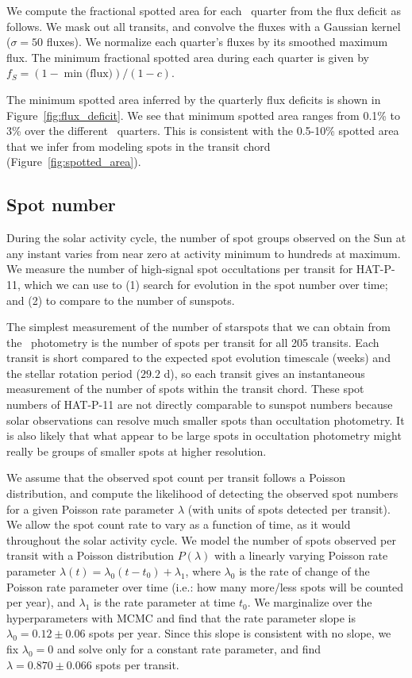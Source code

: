 We compute the fractional spotted area for each \kepler\ quarter from the flux deficit as follows. We mask out all transits, and convolve the fluxes with a Gaussian kernel ($\sigma=50$ fluxes). We normalize each quarter's fluxes by its smoothed maximum flux. The minimum fractional spotted area during each quarter is given by $f_S = \left( 1 - \min\textrm{(flux)} \right)/(1-c)$.

The minimum spotted area inferred by the quarterly flux deficits is shown in Figure~\ref{fig:flux_deficit}. We see that minimum spotted area ranges from 0.1\% to 3\% over the different \kepler\ quarters. This is consistent with the 0.5-10\% spotted area that we infer from modeling spots in the transit chord (Figure~\ref{fig:spotted_area}).  


\subsection{Spot number} \label{sec:spot_number}

During the solar activity cycle, the number of spot groups observed on the Sun at any instant varies from near zero at activity minimum to hundreds at maximum. We measure the number of high-signal spot occultations per transit for HAT-P-11, which we can use to (1) search for evolution in the spot number over time; and (2) to compare to the number of sunspots.

The simplest measurement of the number of starspots that we can obtain from the \kepler\ photometry is the number of spots per transit for all 205 transits. Each transit is short compared to the expected spot evolution timescale (weeks) and the stellar rotation period ($29.2$ d), so each transit gives an instantaneous measurement of the number of spots within the transit chord. These spot numbers of HAT-P-11 are not directly comparable to sunspot numbers because solar observations can resolve much smaller spots than occultation photometry. It is also likely that what appear to be large spots in occultation photometry might really be groups of smaller spots at higher resolution.

We assume that the observed spot count per transit follows a Poisson distribution, and compute the likelihood of detecting the observed spot numbers for a given Poisson rate parameter $\lambda$ (with units of spots detected per transit). We allow the spot count rate to vary as a function of time, as it would throughout the solar activity cycle. We model the number of spots observed per transit with a Poisson distribution $P(\lambda)$ with a linearly varying Poisson rate parameter $\lambda(t) = \lambda_0 (t-t_0) + \lambda_1$, where $\lambda_0$ is the rate of change of the Poisson rate parameter over time (i.e.: how many more/less spots will be counted per year), and $\lambda_1$ is the rate parameter at time $t_0$. We marginalize over the hyperparameters with MCMC and find that the rate parameter slope is $\lambda_0 = 0.12 \pm 0.06$ spots per year. Since this slope is consistent with no slope, we fix $\lambda_0 = 0$ and solve only for a constant rate parameter, and find $\lambda = 0.870 \pm 0.066$ spots per transit.

